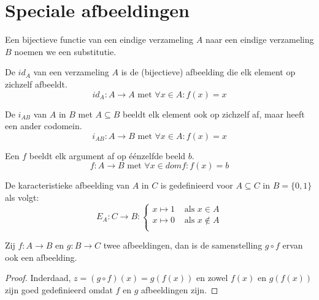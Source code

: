 \documentclass[main.tex]{subfiles}
\begin{document}
\section{Speciale afbeeldingen}
\label{sec:spec-afbe}

\begin{de}
  Een bijectieve functie van een eindige verzameling $A$ naar een eindige verzameling $B$ noemen we een substitutie. 
\end{de}

\begin{de}
  \label{identieke-transformatie}
  De  $id_{A}$ van een verzameling $A$ is de (bijectieve) afbeelding die elk element op zichzelf afbeeldt.
  \[ id_{A}: A \rightarrow A \text{ met } \forall x \in A: f(x) = x \]
\end{de}

\begin{de}
  De  $i_{AB}$ van $A$ in $B$ met $A \subseteq B$ beeldt elk element ook op zichzelf af, maar heeft een ander codomein.
  \[ i_{AB}: A \rightarrow B \text{ met } \forall x \in A: f(x) = x \]
\end{de}

\begin{de}
  Een  $f$ beeldt elk argument af op \'e\'enzelfde beeld $b$.
  \[ f: A \rightarrow B \text{ met } \forall x \in dom f: f(x) = b \]
\end{de}

\begin{de}
  De karacteristieke afbeelding van $A$ in $C$ is gedefinieerd voor $A \subseteq C$ in $B = \{0,1\}$ als volgt:
  \[
  E_{A}: C \rightarrow B:
  \left \lbrace
    \begin{array}{cc}
      x \mapsto 1 &\text{ als } x \in A\\
      x \mapsto 0 &\text{ als } x \not\in A\\
    \end{array}
  \right.
  \]
\end{de}

\begin{st}
  Zij $f: A \rightarrow B$ en $g: B \rightarrow C$ twee afbeeldingen, dan is de samenstelling $g \circ f$ ervan ook een afbeelding.

  \begin{proof}
    Inderdaad, $z = (g \circ f)(x) = g(f(x))$ en zowel $f(x)$ en $g(f(x))$ zijn goed gedefinieerd omdat $f$ en $g$ afbeeldingen zijn. 
  \end{proof}
\end{st}
\end{document}
